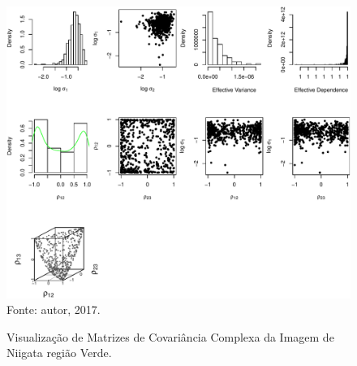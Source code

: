 \documentclass[a4paper,12pt]{article}
\begin{document}
\newpage

\begin{figure}[ht]
\centering
\caption{Visualização de Matrizes de Covariância Complexa da Imagem de Niigata região Verde.}
\includegraphics[width=\linewidth]{../../Figuras/Amostras-Niigata/Niigata-Verde-500.pdf}\\
Fonte: autor, 2017.
\label{visNiigata4}
\end{figure}





\newpage
\end{document}
